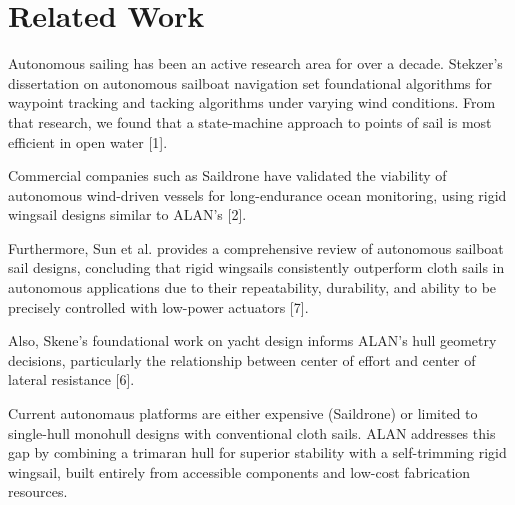 
\section{Related Work}
\label{sec:relatedWork}

Autonomous sailing has been an active research area for over a decade. Stekzer's dissertation on autonomous sailboat navigation set foundational algorithms for waypoint tracking and tacking algorithms under varying wind conditions. From that research, we found that a state-machine approach to points of sail is most efficient in open water [1]. 

Commercial companies such as Saildrone have validated the viability of autonomous wind-driven vessels for long-endurance ocean monitoring, using rigid wingsail designs similar to ALAN's [2]. 

Furthermore, Sun et al. provides a comprehensive review of autonomous sailboat sail designs, concluding that rigid wingsails consistently outperform cloth sails in autonomous applications due to their repeatability, durability, and ability to be precisely controlled with low-power actuators [7]. 

Also, Skene's foundational work on yacht design informs ALAN's hull geometry decisions, particularly the relationship between center of effort and center of lateral resistance [6]. 

Current autonomaus platforms are either expensive (Saildrone) or limited to single-hull monohull designs with conventional cloth sails. ALAN addresses this gap by combining a trimaran hull for superior stability with a self-trimming rigid wingsail, built entirely from accessible components and low-cost fabrication resources.

